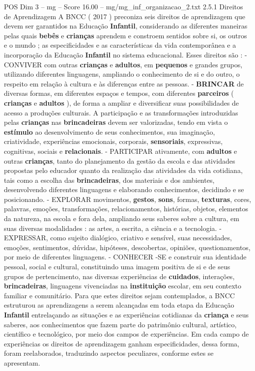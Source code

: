 \begin{textsample}{POS Dim 3 – mg – Score 16.00 – mg/mg\_inf\_organizacao\_2.txt}  \label{ex:f3_pos_267}
2.5.1 Direitos de Aprendizagem A BNCC ( 2017 ) preconiza seis direitos de aprendizagem que devem ser garantidos na Educação \textbf{Infantil}, considerando as diferentes maneiras pelas quais \textbf{bebês} e \textbf{crianças} aprendem e constroem sentidos sobre si, os outros e o mundo ; as especificidades e as características da vida contemporânea e a incorporação da Educação \textbf{Infantil} no sistema educacional.
Esses direitos são : - CONVIVER com outras \textbf{crianças} e \textbf{adultos}, em \textbf{pequenos} e grandes grupos, utilizando diferentes linguagens, ampliando o conhecimento de si e do outro, o respeito em relação à cultura e às diferenças entre as pessoas. - \textbf{BRINCAR} de diversas formas, em diferentes espaços e tempos, com diferentes \textbf{parceiros} ( \textbf{crianças} e \textbf{adultos} ), de forma a ampliar e diversificar suas possibilidades de acesso a produções culturais.
A participação e as transformações introduzidas pelas \textbf{crianças} nas \textbf{brincadeiras} devem ser valorizadas, tendo em vista o \textbf{estímulo} ao desenvolvimento de seus conhecimentos, sua imaginação, criatividade, experiências emocionais, corporais, \textbf{sensoriais}, expressivas, cognitivas, sociais e \textbf{relacionais}. - PARTICIPAR ativamente, com \textbf{adultos} e outras \textbf{crianças}, tanto do planejamento da gestão da escola e das atividades propostas pelo educador quanto da realização das atividades da vida cotidiana, tais como a escolha das \textbf{brincadeiras}, dos materiais e dos ambientes, desenvolvendo diferentes linguagens e elaborando conhecimentos, decidindo e se posicionando. - EXPLORAR movimentos, \textbf{gestos}, \textbf{sons}, formas, \textbf{texturas}, cores, palavras, emoções, transformações, relacionamentos, histórias, objetos, elementos da natureza, na escola e fora dela, ampliando seus saberes sobre a cultura, em suas diversas modalidades : as artes, a escrita, a ciência e a tecnologia. - EXPRESSAR, como sujeito dialógico, criativo e sensível, suas necessidades, emoções, sentimentos, dúvidas, hipóteses, descobertas, opiniões, questionamentos, por meio de diferentes linguagens. - CONHECER -SE e construir sua identidade pessoal, social e cultural, constituindo uma imagem positiva de si e de seus grupos de pertencimento, nas diversas experiências de \textbf{cuidados}, interações, \textbf{brincadeiras}, linguagens vivenciadas na \textbf{instituição} escolar, em seu contexto familiar e comunitário.
Para que estes direitos sejam contemplados, a BNCC estruturou as aprendizagens a serem alcançadas em toda etapa da Educação \textbf{Infantil} entrelaçando as situações e as experiências cotidianas da \textbf{criança} e seus saberes, aos conhecimentos que fazem parte do patrimônio cultural, artístico, científico e tecnológico, por meio dos campos de experiências.
Em cada campo de experiências os direitos de aprendizagem ganham especificidades, dessa forma, foram reelaborados, traduzindo aspectos peculiares, conforme estes se apresentam.

\end{textsample}
